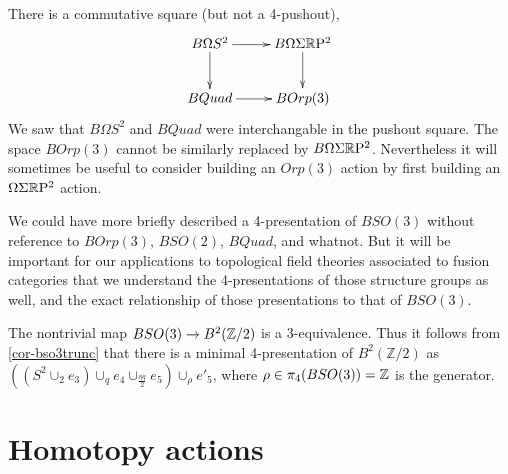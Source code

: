 \documentclass{amsart}
\begin{document}
\begin{remark}
There is a commutative square (but not a 4-pushout),
\[
\vcenter{\hbox{\xymatrix{
B\Omega S^2 \ar[r] \ar[d] & B\Omega \Sigma \RP^2 \ar[d] \\
BQuad \ar[r] & BOrp(3)
}}}
\]
We saw that $B\Omega S^2$ and $BQuad$ were interchangable in the pushout square.  The space $BOrp(3)$ cannot be similarly replaced by $B\Omega \Sigma \mathbb R \mathrm{P}^2$.  Nevertheless it will sometimes be useful to consider building an $Orp(3)$ action by first building an $\Omega \Sigma \mathbb R \mathrm{P}^2$ action.
\end{remark}

We could have more briefly described a 4-presentation of $BSO(3)$ without reference to $BOrp(3)$, $BSO(2)$, $BQuad$, and whatnot.  But it will be important for our applications to topological field theories associated to fusion categories that we understand the 4-presentations of those structure groups as well, and the exact relationship of those presentations to that of $BSO(3)$.


\begin{remark} 
\label{rem:B2Z2space}
The nontrivial map $BSO(3) \rightarrow B^2(\mathbb Z/2)$ is a 3-equivalence. Thus it follows from \cref{cor-bso3trunc} that there is a minimal 4-presentation of $B^2(\mathbb{Z}/2)$ as $((S^2 \cup_2 e_3) \cup_q e_4 \cup_{\frac{\eta q}{2}} e_5) \cup_{\rho} e'_5$, where $\rho \in \pi_4(BSO(3)) = \mathbb Z$ is the generator.
\end{remark}

\section{Homotopy actions}

\end{document}
